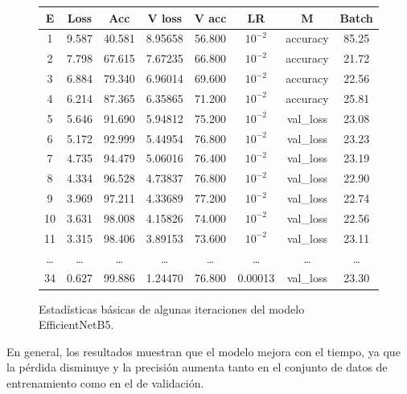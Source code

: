     \begin{figure}[ht]
      \small
      \begin{center}
          \begin{tabular}{|c|c|c|c|c|c|c|c|} \hline
          E & Loss & Acc & V loss & V acc & LR & M & Batch \\ \hline
          1 & 9.587 & 40.581 & 8.95658 & 56.800 & $10^{-2}$ & accuracy & 85.25 \\ \hline
          2 & 7.798 & 67.615 & 7.67235 & 66.800 & $10^{-2}$ & accuracy & 21.72 \\ \hline
          3 & 6.884 & 79.340 & 6.96014 & 69.600 & $10^{-2}$ & accuracy & 22.56 \\ \hline
          4 & 6.214 & 87.365 & 6.35865 & 71.200 & $10^{-2}$ & accuracy & 25.81 \\ \hline
          5 & 5.646 & 91.690 & 5.94812 & 75.200 & $10^{-2}$ & val\_loss & 23.08 \\ \hline
          6 & 5.172 & 92.999 & 5.44954 & 76.800 & $10^{-2}$ & val\_loss & 23.23 \\ \hline
          7 & 4.735 & 94.479 & 5.06016 & 76.400 & $10^{-2}$ & val\_loss & 23.19 \\ \hline
          8 & 4.334 & 96.528 & 4.73837 & 76.800 & $10^{-2}$ & val\_loss & 22.90 \\ \hline
          9 & 3.969 & 97.211 & 4.33689 & 77.200 & $10^{-2}$ & val\_loss & 22.74 \\ \hline
          10 & 3.631 & 98.008 & 4.15826 & 74.000 & $10^{-2}$ & val\_loss & 22.56 \\ \hline
          11 & 3.315 & 98.406 & 3.89153 & 73.600 & $10^{-2}$ & val\_loss & 23.11 \\ \hline
          \dots & \dots & \dots & \dots & \dots & \dots & \dots & \dots \\ \hline
          34 & 0.627 & 99.886 & 1.24470 & 76.800 & 0.00013 & val\_loss & 23.30 \\ \hline
          \end{tabular}
          \caption{Estadísticas básicas de algunas iteraciones del modelo EfficientNetB5.}
      \end{center}\label{fig:estadisticas_p2}
  \end{figure}
    
    En general, los resultados muestran que el modelo mejora con el tiempo, ya que la pérdida disminuye y la precisión aumenta tanto en el conjunto de datos de entrenamiento como en el de validación.


